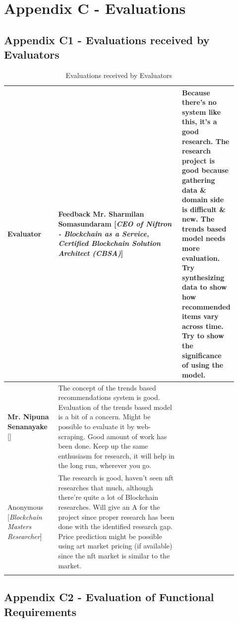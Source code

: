 \chapter{Appendix C - Evaluations}
\label{appendix:C}

\section*{Appendix C1 - Evaluations received by Evaluators}


\vspace{-4mm}
\begin{longtable}{|p{0.23\linewidth}|p{0.69\linewidth}|}
\caption{Evaluations received by Evaluators}
\label{tab:evaluators-eval-feedback}
\\
\hline
\textbf{Evaluator} & \textbf{Feedback} \endfirsthead
\hline
\textbf{Mr. Sharmilan Somasundaram}
[\textit{CEO of Niftron - Blockchain as a Service, Certified Blockchain Solution Architect (CBSA)}]
&  Because there's no system like this, it's a good research. The research project is good because gathering data \& domain side is difficult \& new.
The trends based model needs more evaluation. Try synthesizing data to show how recommended items vary across time. Try to show the significance of using the model.
\\
\hline
\textbf{Mr. Nipuna Senanayake} [\textit{}] & The concept of the trends based recommendations system is good. Evaluation of the trends based model is a bit of a concern. Might be possible to evaluate it by web-scraping.
Good amount of work has been done. Keep up the same enthusiasm for research, it will help in the long run, wherever you go.
 \\
\hline
Anonymous [\textit{Blockchain Masters Researcher}] & The research is good, haven't seen \gls{nft} researches that much, although there're quite a lot of Blockchain researches. Will give an A for the project since proper research has been done with the identified research gap.
Price prediction might be possible using art market pricing (if available) since the \gls{nft} market is similar to the market.
\\
\hline
 & \\
\hline
\end{longtable}

\section*{Appendix C2 - Evaluation of Functional Requirements}

